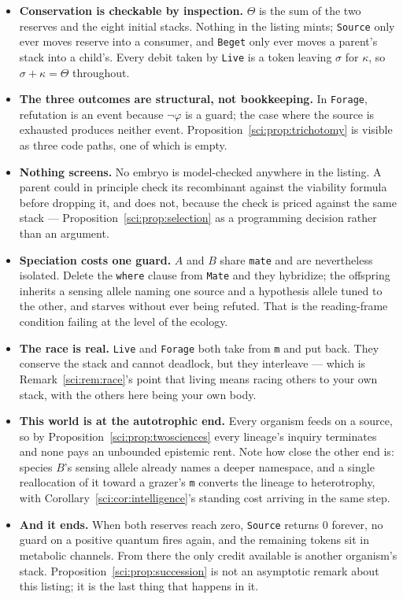 \begin{itemize}
\item \textbf{Conservation is checkable by inspection.} $\Theta$ is the sum of the two reserves and
the eight initial stacks. Nothing in the listing mints; \texttt{Source} only ever moves reserve into a
consumer, and \texttt{Beget} only ever moves a parent's stack into a child's. Every debit taken by
\texttt{Live} is a token leaving $\sigma$ for $\kappa$, so $\sigma + \kappa = \Theta$ throughout.

\item \textbf{The three outcomes are structural, not bookkeeping.} In \texttt{Forage}, refutation is
an event because $\lnot\varphi$ is a guard; the case where the source is exhausted produces neither
event. Proposition~\ref{sci:prop:trichotomy} is visible as three code paths, one of which is empty.

\item \textbf{Nothing screens.} No embryo is model-checked anywhere in the listing. A parent could
in principle check its recombinant against the viability formula before dropping it, and does not,
because the check is priced against the same stack --- Proposition~\ref{sci:prop:selection} as a
programming decision rather than an argument.

\item \textbf{Speciation costs one guard.} $A$ and $B$ share \texttt{mate} and are nevertheless
isolated. Delete the \texttt{where} clause from \texttt{Mate} and they hybridize; the offspring
inherits a sensing allele naming one source and a hypothesis allele tuned to the other, and starves
without ever being refuted. That is the reading-frame condition failing at the level of the ecology.

\item \textbf{The race is real.} \texttt{Live} and \texttt{Forage} both take from \texttt{m} and put
back. They conserve the stack and cannot deadlock, but they interleave --- which is
Remark~\ref{sci:rem:race}'s point that living means racing others to your own stack, with the others
here being your own body.

\item \textbf{This world is at the autotrophic end.} Every organism feeds on a source, so by
Proposition~\ref{sci:prop:twosciences} every lineage's inquiry terminates and none pays an unbounded
epistemic rent. Note how close the other end is: species $B$'s sensing allele already names a deeper
namespace, and a single reallocation of it toward a grazer's \texttt{m} converts the lineage to
heterotrophy, with Corollary~\ref{sci:cor:intelligence}'s standing cost arriving in the same step.

\item \textbf{And it ends.} When both reserves reach zero, \texttt{Source} returns $0$ forever, no
guard on a positive quantum fires again, and the remaining tokens sit in metabolic channels. From
there the only credit available is another organism's stack. Proposition~\ref{sci:prop:succession} is not
an asymptotic remark about this listing; it is the last thing that happens in it.
\end{itemize}

